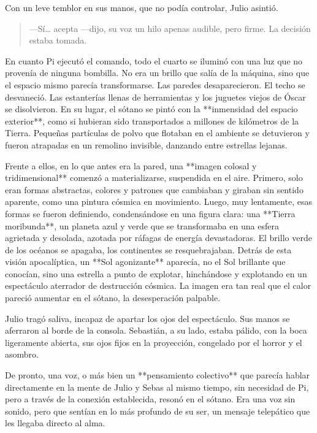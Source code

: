 \documentclass[a4paper,12pt]{book}
\begin{document}
Con un leve temblor en sus manos, que no podía controlar, Julio asintió.

\begin{quote}
    —Sí… acepta —dijo, su voz un hilo apenas audible, pero firme. La decisión estaba tomada.
\end{quote}

En cuanto Pi ejecutó el comando, todo el cuarto se iluminó con una luz que no provenía de ninguna bombilla. No era un brillo que salía de la máquina, sino que el espacio mismo parecía transformarse. Las paredes desaparecieron. El techo se desvaneció. Las estanterías llenas de herramientas y los juguetes viejos de Óscar se disolvieron. En su lugar, el sótano se pintó con la **inmensidad del espacio exterior**, como si hubieran sido transportados a millones de kilómetros de la Tierra. Pequeñas partículas de polvo que flotaban en el ambiente se detuvieron y fueron atrapadas en un remolino invisible, danzando entre estrellas lejanas.

Frente a ellos, en lo que antes era la pared, una **imagen colosal y tridimensional** comenzó a materializarse, suspendida en el aire. Primero, solo eran formas abstractas, colores y patrones que cambiaban y giraban sin sentido aparente, como una pintura cósmica en movimiento. Luego, muy lentamente, esas formas se fueron definiendo, condensándose en una figura clara: una **Tierra moribunda**, un planeta azul y verde que se transformaba en una esfera agrietada y desolada, azotada por ráfagas de energía devastadoras. El brillo verde de los océanos se apagaba, los continentes se resquebrajaban. Detrás de esta visión apocalíptica, un **Sol agonizante** aparecía, no el Sol brillante que conocían, sino una estrella a punto de explotar, hinchándose y explotando en un espectáculo aterrador de destrucción cósmica. La imagen era tan real que el calor pareció aumentar en el sótano, la desesperación palpable.

Julio tragó saliva, incapaz de apartar los ojos del espectáculo. Sus manos se aferraron al borde de la consola. Sebastián, a su lado, estaba pálido, con la boca ligeramente abierta, sus ojos fijos en la proyección, congelado por el horror y el asombro.

De pronto, una voz, o más bien un **pensamiento colectivo** que parecía hablar directamente en la mente de Julio y Sebas al mismo tiempo, sin necesidad de Pi, pero a través de la conexión establecida, resonó en el sótano. Era una voz sin sonido, pero que sentían en lo más profundo de su ser, un mensaje telepático que les llegaba directo al alma.
\end{document}
